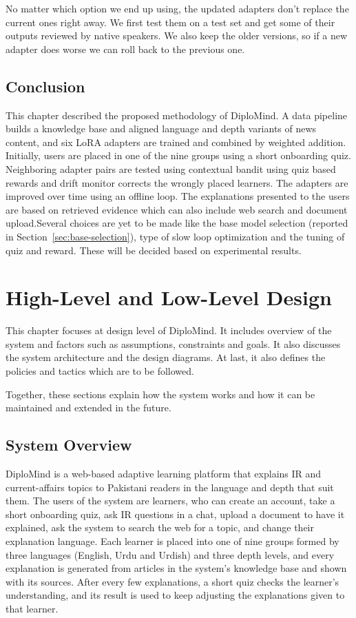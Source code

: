 \documentclass{FastFyp}
\begin{document}
No matter which option we end up using, the updated adapters don’t replace the current ones right away. We first test them on a test set and get some of their outputs reviewed by native speakers. We also keep the older versions, so if a new adapter does worse we can roll back to the previous one.

\section{Conclusion}
This chapter described the proposed methodology of DiploMind. A data pipeline builds a knowledge base
and aligned language and depth variants of news content, and six LoRA adapters are trained and combined by weighted addition. Initially, users are placed in one of the nine groups using a short onboarding quiz. Neighboring adapter pairs are tested using contextual bandit using quiz based rewards and drift monitor corrects the wrongly placed learners. The adapters are improved over time using an offline loop. The explanations presented to the users are based on retrieved evidence which can also include web search and document upload.Several choices are yet to be made like the base model selection (reported in Section~\ref{sec:base-selection}), type of slow loop optimization and the tuning of quiz and reward. These will be decided based on experimental results.

\chapter{High-Level and Low-Level Design}
This chapter focuses at design level of DiploMind. It includes overview of the system and factors such as assumptions, constraints and goals. It also discusses the system architecture and the design diagrams. At last, it also defines the policies and tactics which are to be followed.

Together, these sections explain how the system works and how it can be maintained and extended in the future.
\section{System Overview}
DiploMind is a web-based adaptive learning platform that explains IR and current-affairs topics to Pakistani readers in the language and depth that suit them. The users of the system are learners, who can create an account, take a short onboarding quiz, ask IR questions in a chat, upload a document to have it explained, ask the system to search the web for a topic, and change their explanation language. Each learner is placed into one of nine groups formed by three languages (English, Urdu and Urdish) and three depth levels, and every explanation is generated from articles in the system's knowledge base and shown with its sources. After every few explanations, a short quiz checks the learner's understanding, and its result is used to keep adjusting the explanations given to that learner.
 
\end{document}
